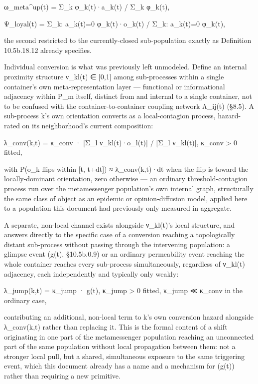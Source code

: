 \documentclass[
]{article}
\begin{document}
ω\_meta\^{}up(t) = Σ\_k φ\_k(t)·a\_k(t) / Σ\_k φ\_k(t),

Ψ\_loyal(t) = Σ\_k: a\_k(t)=0 φ\_k(t)·o\_k(t) / Σ\_k: a\_k(t)=0 φ\_k(t),

the second restricted to the currently-closed sub-population exactly as
Definition 10.5b.18.12 already specifies.

Individual conversion is what was previously left unmodeled. Define an
internal proximity structure ν\_kl(t) ∈ {[}0,1{]} among sub-processes
within a single container's own meta-representation layer --- functional
or informational adjacency within P\_m itself, distinct from and
internal to a single container, not to be confused with the
container-to-container coupling network Λ\_ij(t) (§8.5). A sub-process
k's own orientation converts as a local-contagion process, hazard-rated
on its neighborhood's current composition:

λ\_conv(k,t) = κ\_conv · {[}Σ\_l ν\_kl(t)·o\_l(t){]} / {[}Σ\_l
ν\_kl(t){]}, κ\_conv \textgreater{} 0 fitted,

with P(o\_k flips within {[}t, t+dt{]}) ≈ λ\_conv(k,t)·dt when the flip
is toward the locally-dominant orientation, zero otherwise --- an
ordinary threshold-contagion process run over the metamessenger
population's own internal graph, structurally the same class of object
as an epidemic or opinion-diffusion model, applied here to a population
this document had previously only measured in aggregate.

A separate, non-local channel exists alongside ν\_kl(t)'s local
structure, and answers directly to the specific case of a conversion
reaching a topologically distant sub-process without passing through the
intervening population: a glimpse event (g(t), §10.5b.0.9) or an
ordinary permeability event reaching the whole container reaches every
sub-process simultaneously, regardless of ν\_kl(t) adjacency, each
independently and typically only weakly:

λ\_jump(k,t) = κ\_jump · g(t), κ\_jump \textgreater{} 0 fitted, κ\_jump
≪ κ\_conv in the ordinary case,

contributing an additional, non-local term to k's own conversion hazard
alongside λ\_conv(k,t) rather than replacing it. This is the formal
content of a shift originating in one part of the metamessenger
population reaching an unconnected part of the same population without
local propagation between them: not a stronger local pull, but a shared,
simultaneous exposure to the same triggering event, which this document
already has a name and a mechanism for (g(t)) rather than requiring a
new primitive.
\end{document}
